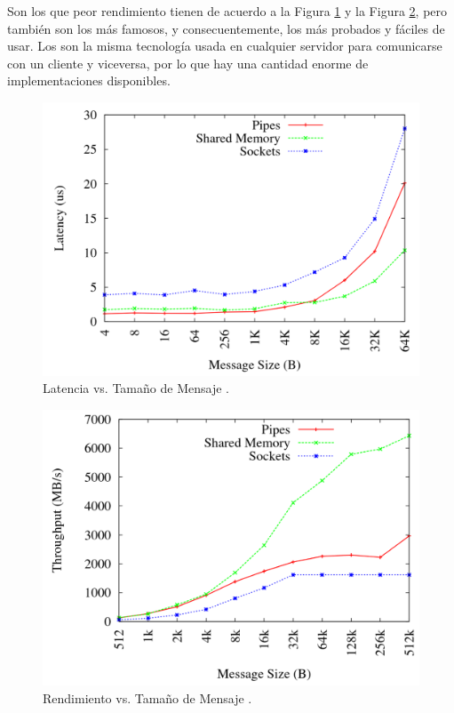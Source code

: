 Son los que peor rendimiento tienen de acuerdo a la Figura
\ref{fig:ipc_comparison1} y la Figura \ref{fig:ipc_comparison2}, pero también
son los más famosos, y consecuentemente, los más probados y fáciles de usar. Los
\sockets son la misma tecnología usada en cualquier servidor para comunicarse
con un cliente y viceversa, por lo que hay una cantidad enorme de
implementaciones disponibles.

\begin{figure}
    \centering
    \includegraphics[width=12cm]{./Imagenes/venkataraman2015evaluation1.png}
    \caption{Latencia vs. Tamaño de Mensaje \cite{venkataraman2015evaluation}.}%
    \label{fig:ipc_comparison1}
\end{figure}

\begin{figure}
    \centering
    \includegraphics[width=12cm]{./Imagenes/venkataraman2015evaluation2.png}
    \caption{Rendimiento vs. Tamaño de Mensaje
    \cite{venkataraman2015evaluation}.}%
    \label{fig:ipc_comparison2}
\end{figure}


